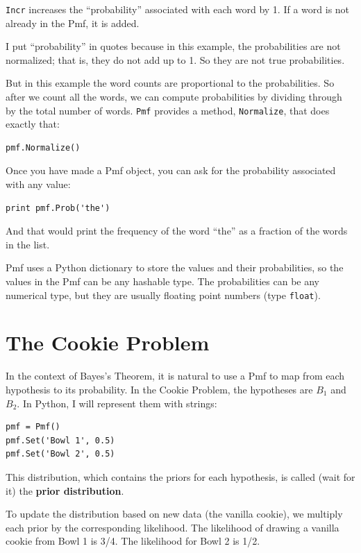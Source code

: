 \documentclass[12pt]{book}
\begin{document}
\verb"Incr" increases the ``probability'' associated with each
word by 1.  If a word is not already in the Pmf, it is added.

I put ``probability'' in quotes because in this example, the
probabilities are not normalized; that is, they do not add up to 1.
So they are not true probabilities.

But in this example the word counts are proportional to the probabilities.
So after we count all the words, we can compute probabilities by
dividing through by the total number of words.  {\tt Pmf} provides
a method, \verb"Normalize", that does exactly that:

\begin{verbatim}
pmf.Normalize()
\end{verbatim}

Once you have made a Pmf object, you can ask for the probability
associated with any value:

\begin{verbatim}
print pmf.Prob('the')
\end{verbatim}

And that would print the frequency of the word ``the'' as a fraction
of the words in the list.

Pmf uses a Python dictionary to store the values and their
probabilities, so the values in the Pmf can be any hashable type.
The probabilities can be any numerical type, but they are usually
floating point numbers (type \verb"float").


\section{The Cookie Problem}

In the context of Bayes's Theorem, it is natural to use a Pmf
to map from each hypothesis to its probability.  In the Cookie
Problem, the hypotheses are $B_1$ and $B_2$.  In Python, I will
represent them with strings:

\begin{verbatim}
pmf = Pmf()
pmf.Set('Bowl 1', 0.5)
pmf.Set('Bowl 2', 0.5)
\end{verbatim}

This distribution, which contains the priors for each hypothesis,
is called (wait for it) the {\bf prior distribution}.

To update the distribution based on new data (the vanilla cookie),
we multiply each prior by the corresponding likelihood.  The likelihood
of drawing a vanilla cookie from Bowl 1 is 3/4.  The likelihood
for Bowl 2 is 1/2.
\end{document}
